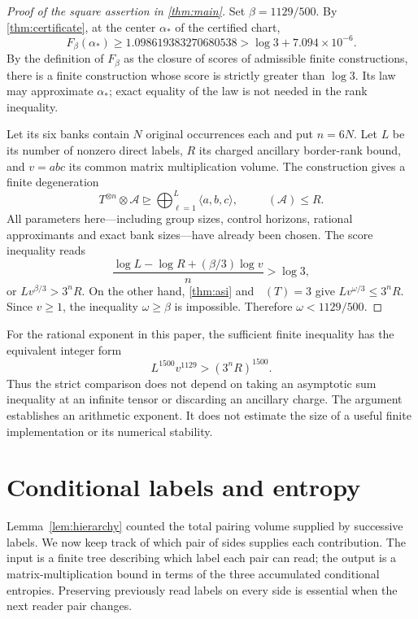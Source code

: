 \documentclass[11pt]{article}
\numberwithin{equation}{section}
\theoremstyle{definition}
\theoremstyle{remark}
\DeclareMathOperator{\brank}{\underline R}
\begin{document}
\begin{proof}[Proof of the square assertion in \cref{thm:main}]
Set \(\beta=1129/500\).
By \cref{thm:certificate}, at the center \(\alpha_*\) of the certified chart,
\[
F_\beta(\alpha_*)\ge 1.098619383270680538
>\log3+7.094\times10^{-6}.
\]
By the definition of \(F_\beta\) as the closure of scores of admissible
finite constructions, there is a finite construction whose score is
strictly greater than \(\log3\).
Its law may approximate \(\alpha_*\); exact equality of the law is not
needed in the rank inequality.

Let its six banks contain \(N\) original occurrences each and put \(n=6N\).
Let \(L\) be its number of nonzero direct labels,
\(R\) its charged ancillary border-rank bound, and
\(v=abc\) its common matrix multiplication volume.
The construction gives a finite degeneration
\[
T^{\otimes n}\otimes\mathcal A
\unrhd\bigoplus_{\ell=1}^L\langle a,b,c\rangle,
\qquad \brank(\mathcal A)\le R.
\]
All parameters here---including group sizes, control horizons, rational
approximants and exact bank sizes---have already been chosen.
The score inequality reads
\[
\frac{\log L-\log R+(\beta/3)\log v}{n}>\log3,
\]
or \(Lv^{\beta/3}>3^nR\).
On the other hand, \cref{thm:asi} and \(\brank(T)=3\) give
\(Lv^{\omega/3}\le3^nR\).
Since \(v\ge1\), the inequality \(\omega\ge\beta\) is impossible.
Therefore \(\omega<1129/500\).
\end{proof}

For the rational exponent in this paper, the sufficient finite inequality
has the equivalent integer form
\[
L^{1500}v^{1129}>(3^nR)^{1500}.
\]
Thus the strict comparison does not depend on taking an asymptotic sum
inequality at an infinite tensor or discarding an ancillary charge.
The argument establishes an arithmetic exponent.  It does not estimate
the size of a useful finite implementation or its numerical stability.

\section{Conditional labels and entropy}\label{sec:trees}

Lemma~\ref{lem:hierarchy} counted the total pairing volume supplied by
successive labels.  We now keep track of which pair of sides supplies
each contribution.  The input is a finite tree describing which label
each pair can read; the output is a matrix-multiplication bound in
terms of the three accumulated conditional entropies.  Preserving
previously read labels on every side is essential when the next
reader pair changes.
\end{document}
